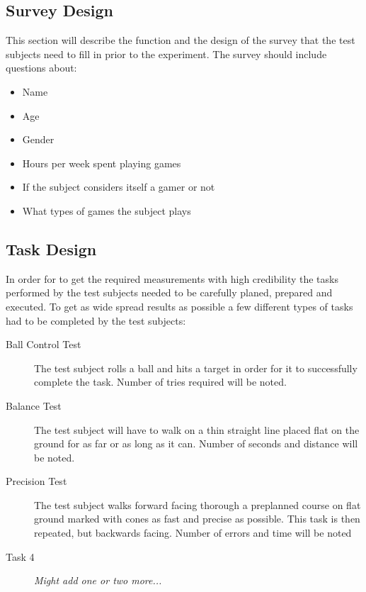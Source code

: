 \documentclass[runningheads,a4paper,oribibl]{llncs}
\begin{document}
\subsection{Survey Design}

This section will describe the function and the design of the survey that the test subjects need to fill in prior to the experiment. The survey should include questions about:
\begin{itemize}
	\item Name
	\item Age
	\item Gender
	\item Hours per week spent playing games
	\item If the subject considers itself a gamer or not
	\item What types of games the subject plays
\end{itemize}











\subsection{Task Design}
In order for to get the required measurements with high credibility the tasks performed by the test subjects needed to be carefully planed, prepared and executed. To get as wide spread results as possible a few different types of tasks had to be completed by the test subjects:

\begin{description}
   \item[Ball Control Test] The test subject rolls a ball and hits a target in order for it to successfully complete the task. Number of tries required will be noted.
   \item[Balance Test] The test subject will have to walk on a thin straight line placed flat on the ground for as far or as long as it can. Number of seconds and distance will be noted.
   \item[Precision Test] The test subject walks forward facing thorough a preplanned course on flat ground marked with cones as fast and precise as possible. This task is then repeated, but backwards facing. Number of errors and time will be noted
   \item[Task 4] \emph{Might add one or two more...}
\end{description}
\end{document}
